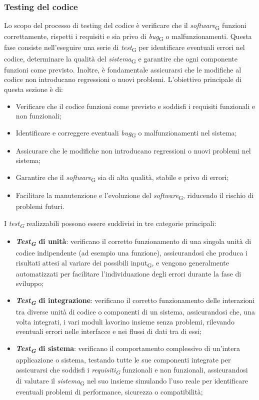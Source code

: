 \subsubsection{Testing del codice}
Lo scopo del processo di testing del codice è verificare che il \textit{software}\textsubscript{G} funzioni correttamente, rispetti i requisiti e sia privo di \textit{bug}\textsubscript{G} o malfunzionamenti. Questa fase consiste nell'eseguire una serie di \textit{test}\textsubscript{G} per identificare eventuali errori nel codice, determinare la qualità del \textit{sistema}\textsubscript{G} e garantire che ogni componente funzioni come previsto. Inoltre, è fondamentale assicurarsi che le modifiche al codice non introducano regressioni o nuovi problemi. L'obiettivo principale di questa sezione è di:
\begin{itemize}
    \item Verificare che il codice funzioni come previsto e soddisfi i requisiti funzionali e non funzionali;
    \item Identificare e correggere eventuali \textit{bug}\textsubscript{G} o malfunzionamenti nel sistema;
    \item Assicurare che le modifiche non introducano regressioni o nuovi problemi nel sistema;
    \item Garantire che il \textit{software}\textsubscript{G} sia di alta qualità, stabile e privo di errori;
    \item Facilitare la manutenzione e l'evoluzione del \textit{software}\textsubscript{G}, riducendo il rischio di problemi futuri.
\end{itemize}

I \textit{test\textsubscript{G}} realizzabili possono essere suddivisi in tre categorie principali:
\begin{itemize}
    \item \textbf{\textit{Test\textsubscript{G}} di unità}: verificano il corretto funzionamento di una singola unità di codice indipendente (ad esempio una funzione), assicurandosi che produca i risultati attesi al variare dei possibili input\textsubscript{G}, e vengono generalmente automatizzati per facilitare l'individuazione degli errori durante la fase di sviluppo;
    \item \textbf{\textit{Test\textsubscript{G}} di integrazione}: verificano il corretto funzionamento delle interazioni tra diverse unità di codice o componenti di un sistema, assicurandosi che, una volta integrati, i vari moduli lavorino insieme senza problemi, rilevando eventuali errori nelle interfacce e nei flussi di dati tra di essi;
    \item \textbf{\textit{Test\textsubscript{G}} di sistema}: verificano il comportamento complessivo di un'intera applicazione o sistema, testando tutte le sue componenti integrate per assicurarsi che soddisfi i \textit{requisiti\textsubscript{G}} funzionali e non funzionali, assicurandosi di valutare il \textit{sistema}\textsubscript{G} nel suo insieme simulando l'uso reale per identificare eventuali problemi di performance, sicurezza o compatibilità;
\end{itemize}


